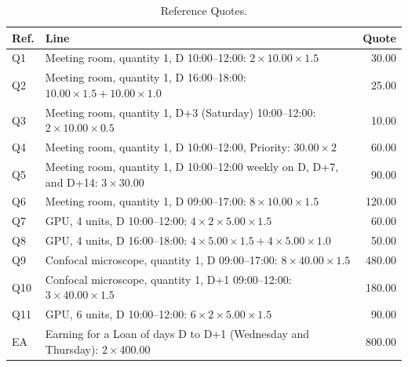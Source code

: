 \begin{table}[h]
\centering\small
\caption{Reference Quotes.}\label{tab:quotes}
\begin{tabularx}{\textwidth}{@{}lYr@{}}
\toprule
\textbf{Ref.} & \textbf{Line} & \textbf{Quote} \\
\midrule
Q1 & Meeting room, quantity 1, D 10:00--12:00: $2 \times 10.00 \times 1.5$ & 30.00 \\
Q2 & Meeting room, quantity 1, D 16:00--18:00: $10.00 \times 1.5 + 10.00 \times 1.0$ & 25.00 \\
Q3 & Meeting room, quantity 1, D+3 (Saturday) 10:00--12:00: $2 \times 10.00 \times 0.5$ & 10.00 \\
Q4 & Meeting room, quantity 1, D 10:00--12:00, Priority: $30.00 \times 2$ & 60.00 \\
Q5 & Meeting room, quantity 1, D 10:00--12:00 weekly on D, D+7, and D+14: $3 \times 30.00$ & 90.00 \\
Q6 & Meeting room, quantity 1, D 09:00--17:00: $8 \times 10.00 \times 1.5$ & 120.00 \\
Q7 & GPU, 4 units, D 10:00--12:00: $4 \times 2 \times 5.00 \times 1.5$ & 60.00 \\
Q8 & GPU, 4 units, D 16:00--18:00: $4 \times 5.00 \times 1.5 + 4 \times 5.00 \times 1.0$ & 50.00 \\
Q9 & Confocal microscope, quantity 1, D 09:00--17:00: $8 \times 40.00 \times 1.5$ & 480.00 \\
Q10 & Confocal microscope, quantity 1, D+1 09:00--12:00: $3 \times 40.00 \times 1.5$ & 180.00 \\
Q11 & GPU, 6 units, D 10:00--12:00: $6 \times 2 \times 5.00 \times 1.5$ & 90.00 \\
\midrule
EA & Earning for a Loan of days D to D+1 (Wednesday and Thursday): $2 \times 400.00$ & 800.00 \\
\bottomrule
\end{tabularx}
\end{table}
